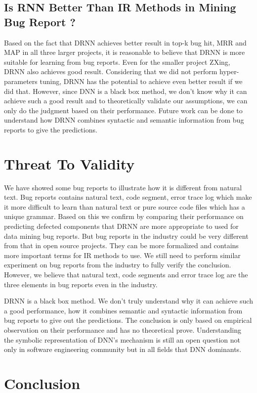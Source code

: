 \subsection{Is RNN Better Than IR Methods in Mining Bug Report ?}
Based on the fact that DRNN achieves better result in top-k bug hit, MRR and MAP in all three larger projects, it is reasonable to believe that DRNN is more suitable for learning from bug reports. Even for the smaller project ZXing, DRNN also achieves good result. 
Considering that we did not perform hyper-parameters tuning, DRNN has the potential to achieve even better result if we did that. 
However, since DNN is a black box method, we don't know why it can achieve such a good result and to theoretically validate our assumptions, we can only do the judgment based on their performance. 
Future work can be done to understand how DRNN combines syntactic and semantic information from bug reports to give the predictions.
 

\section{Threat To Validity}
We have showed some bug reports to illustrate how it is different from natural text. Bug reports contains natural text, code segment, error trace log which make it more difficult to learn than natural text or pure source code files which has a unique grammar. Based on this we confirm by comparing their performance on predicting defected components that DRNN are more appropriate to used for data mining bug reports. 
But bug reports in the industry could be very different from that in open source projects. 
They can be more formalized and contains more important terms for IR methods to use. 
We still need to perform similar experiment on bug reports from the industry to fully verify the conclusion. 
However, we believe that natural text, code segments and error trace log are the three elements in bug reports even in the industry. 

DRNN is a black box method. 
We don't truly understand why it can achieve such a good performance, how it combines semantic and syntactic information from bug reports to give out the predictions.
The conclusion is only based on empirical observation on their performance and has no theoretical prove.
Understanding the symbolic representation of DNN's mechanism is still an open question not only in software engineering community but in all fields that DNN dominants.   

\section{Conclusion}







	 
